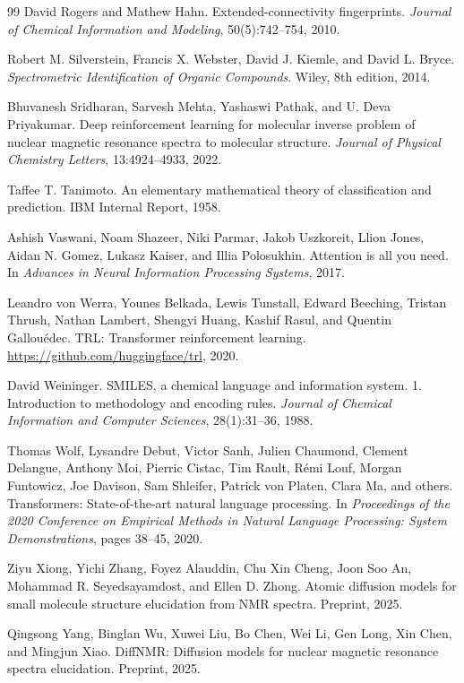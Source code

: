 \documentclass{article}
\begin{document}
{\begin{thebibliography}{99}
David Rogers and Mathew Hahn.
Extended-connectivity fingerprints.
\textit{Journal of Chemical Information and Modeling}, 50(5):742--754, 2010.

Robert M. Silverstein, Francis X. Webster, David J. Kiemle, and David L. Bryce.
\textit{Spectrometric Identification of Organic Compounds}.
Wiley, 8th edition, 2014.

Bhuvanesh Sridharan, Sarvesh Mehta, Yashaswi Pathak, and U. Deva Priyakumar.
Deep reinforcement learning for molecular inverse problem of nuclear magnetic resonance spectra to molecular structure.
\textit{Journal of Physical Chemistry Letters}, 13:4924--4933, 2022.

Taffee T. Tanimoto.
An elementary mathematical theory of classification and prediction.
IBM Internal Report, 1958.

Ashish Vaswani, Noam Shazeer, Niki Parmar, Jakob Uszkoreit, Llion Jones, Aidan N. Gomez, Lukasz Kaiser, and Illia Polosukhin.
Attention is all you need.
In \textit{Advances in Neural Information Processing Systems}, 2017.

Leandro von Werra, Younes Belkada, Lewis Tunstall, Edward Beeching, Tristan Thrush, Nathan Lambert, Shengyi Huang, Kashif Rasul, and Quentin Gallou{\'e}dec.
TRL: Transformer reinforcement learning.
\url{https://github.com/huggingface/trl}, 2020.

David Weininger.
SMILES, a chemical language and information system. 1. Introduction to methodology and encoding rules.
\textit{Journal of Chemical Information and Computer Sciences}, 28(1):31--36, 1988.

Thomas Wolf, Lysandre Debut, Victor Sanh, Julien Chaumond, Clement Delangue, Anthony Moi, Pierric Cistac, Tim Rault, R{\'e}mi Louf, Morgan Funtowicz, Joe Davison, Sam Shleifer, Patrick von Platen, Clara Ma, and others.
Transformers: State-of-the-art natural language processing.
In \textit{Proceedings of the 2020 Conference on Empirical Methods in Natural Language Processing: System Demonstrations}, pages 38--45, 2020.

Ziyu Xiong, Yichi Zhang, Foyez Alauddin, Chu Xin Cheng, Joon Soo An, Mohammad R. Seyedsayamdost, and Ellen D. Zhong.
Atomic diffusion models for small molecule structure elucidation from NMR spectra.
Preprint, 2025.

Qingsong Yang, Binglan Wu, Xuwei Liu, Bo Chen, Wei Li, Gen Long, Xin Chen, and Mingjun Xiao.
DiffNMR: Diffusion models for nuclear magnetic resonance spectra elucidation.
Preprint, 2025.


\end{thebibliography}}
\end{document}
